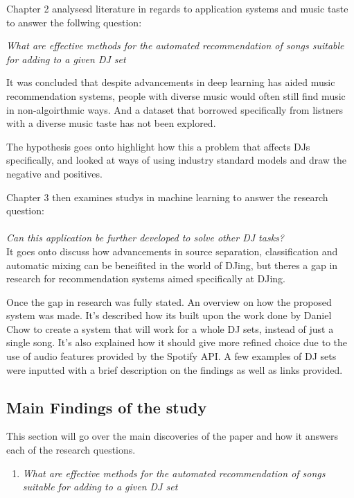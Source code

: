 Chapter 2 analysesd literature in regards to application systems and music taste to answer the follwing question: 

\textit{What are effective methods for the automated recommendation of songs suitable
	for adding to a given DJ set}

It was concluded that despite advancements in deep learning has aided music recommendation systems, people with diverse music would often still find music in non-algoirthmic ways. And a dataset that borrowed specifically from listners with a diverse music taste has not been explored.

The hypothesis goes onto highlight how this a problem that affects DJs specifically, and looked at ways of using industry standard models and draw the negative and positives.

Chapter 3 then examines studys in machine learning to answer the research question:
\\
\\
\textit{Can this application be further developed to solve other DJ tasks?}
\\

It goes onto discuss how advancements in source separation, classification and automatic mixing can be beneifited in the world of DJing, but theres a gap in research for recommendation systems aimed specifically at DJing.

Once the gap in research was fully stated. An overview on how the proposed system was made. It's described how its built upon the work done by Daniel Chow to create a system that will work for a whole DJ sets, instead of just a single song. It's also explained how it should give more refined choice due to the use of audio features provided by the Spotify API. A few examples of DJ sets were inputted with a brief description on the findings as well as links provided.

\subsection{Main Findings of the study}

This section will go over the main discoveries of the paper and how it answers each of the research questions.

\begin{enumerate}
	\item \textit{What are effective methods for the automated recommendation of songs suitable
		for adding to a given DJ set}
\end{enumerate}

